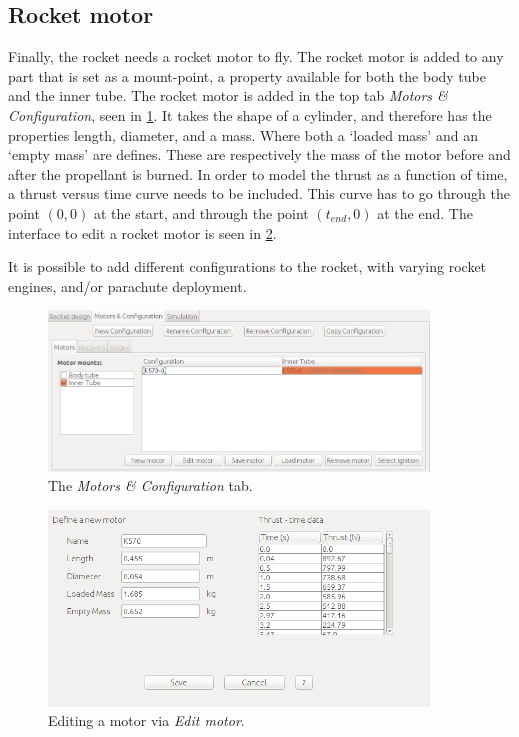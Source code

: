 \documentclass[11pt, a4paper]{article}
\begin{document}
\subsection{Rocket motor} \label{subsec:motor}

Finally, the rocket needs a rocket motor to fly. The rocket motor is added to any part that is set as a mount-point, a property available for both the body tube and the inner tube. The rocket motor is added in the top tab \emph{Motors \& Configuration}, seen in \cref{fig:motor}. It takes the shape of a cylinder, and therefore has the properties length, diameter, and a mass. 
Where both a `loaded mass' and an `empty mass' are defines. These are respectively the mass of the motor before and after the propellant is burned. 
In order to model the thrust as a function of time, a thrust versus time curve needs to be included. This curve has to go through the point $(0,0)$ at the start, and through the point $(t_{end},0)$ at the end. The interface to edit a rocket motor is seen in \cref{fig:motor-edit}.

It is possible to add different configurations to the rocket, with varying rocket engines, and/or parachute deployment.

\begin{figure}[]
  \caption{The \emph{Motors \& Configuration} tab.}
  \label{fig:motor}
  \centering
    \includegraphics[width=0.9\textwidth]{r-motor.png}
\end{figure}

\begin{figure}[]
  \caption{Editing a motor via \emph{Edit motor}.}
  \label{fig:motor-edit}
  \centering
    \includegraphics[width=0.9\textwidth]{r-motor-edit.png}
\end{figure}
\end{document}
